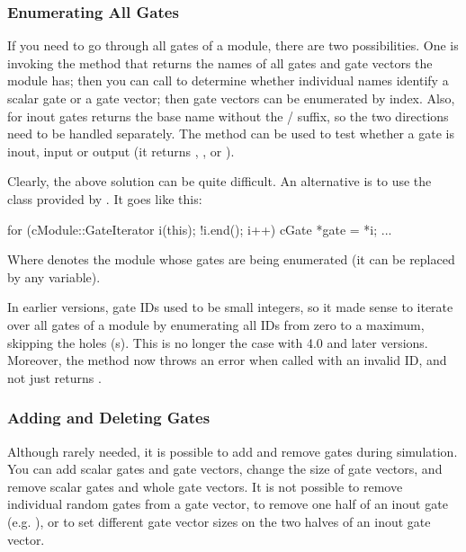 \subsubsection{Enumerating All Gates}
\label{sec:simple-modules:enumerating-gates}

If you need to go through all gates of a module, there are
two possibilities. One is invoking the  method
that returns the names of all gates and gate vectors the module
has; then you can call  to determine
whether individual names identify a scalar gate or a gate vector;
then gate vectors can be enumerated by index. Also, for inout
gates  returns the base name without the
/ suffix, so the two directions
need to be handled separately. The  method
can be used to test whether a gate is inout, input or output
(it returns , , or
).

Clearly, the above solution can be quite difficult. An alternative is to use
the  class provided by .
It goes like this:

\begin{cpp}
for (cModule::GateIterator i(this); !i.end(); i++) {
    cGate *gate = *i;
    ...
}
\end{cpp}

Where  denotes the module whose gates are being enumerated
(it can be replaced by any  variable).

\begin{note}
    In earlier {\opp} versions, gate IDs used to be small integers, so
    it made sense to iterate over all gates of a module by enumerating
    all IDs from zero to a maximum, skipping the holes (s).
    This is no longer the case with {\opp} 4.0 and later versions.
    Moreover, the  method now throws an error when called
    with an invalid ID, and not just returns .
\end{note}


\subsubsection{Adding and Deleting Gates}
\label{sec:simple-modules:adding-and-deleting-gates}

Although rarely needed, it is possible to add and remove gates during
simulation. You can add scalar gates and gate vectors, change the size of
gate vectors, and remove scalar gates and whole gate vectors.
It is not possible to remove individual random gates from a gate vector,
to remove one half of an inout gate (e.g. ), or to set
different gate vector sizes on the two halves of an inout gate vector.

